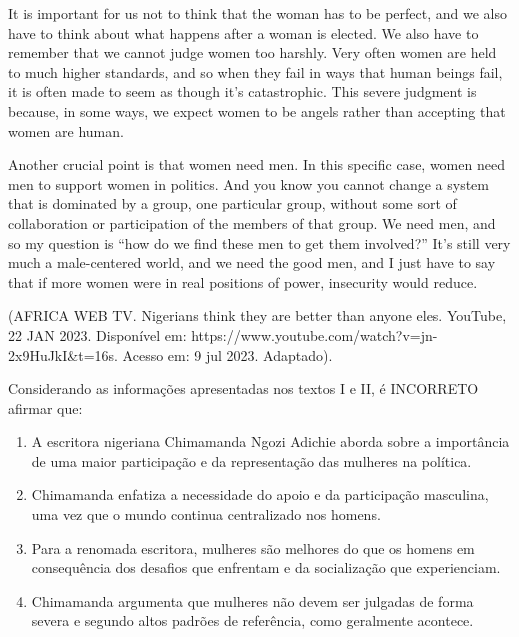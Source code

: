 It is important for us not to think that the woman has to be perfect, and we also have to think about what happens after a woman is elected. We also have to remember that we cannot judge women too harshly. Very often women are held to much higher standards, and so when they fail in ways that human beings fail, it is often made to seem as though it's catastrophic. This severe judgment is because, in some ways, we expect women to be angels rather than accepting that women are human.

Another crucial point is that women need men. In this specific case, women need men to support women in politics. And you know you cannot change a system that is dominated by a group, one particular group, without some sort of collaboration or participation of the members of that group. We need men, and so my question is “how do we find these men to get them involved?” It's still very much a male-centered world, and we need the good men, and I just have to say that if more women were in real positions of power, insecurity would reduce.

(AFRICA WEB TV. Nigerians think they are better than anyone eles. YouTube, 22 JAN 2023. Disponível em: https://www.youtube.com/watch?v=jn-2x9HuJkI&t=16s. Acesso em: 9 jul 2023. Adaptado).

Considerando as informações apresentadas nos textos I e II, é INCORRETO afirmar que:
\begin{enumerate}
\item A escritora nigeriana Chimamanda Ngozi Adichie aborda sobre a importância de uma maior participação e
        da representação das mulheres na política.
\item Chimamanda enfatiza a necessidade do apoio e da participação masculina, uma vez que o mundo
        continua centralizado nos homens.
\item Para a renomada escritora, mulheres são melhores do que os homens em consequência dos desafios que
        enfrentam e da socialização que experienciam.
\item Chimamanda argumenta que mulheres não devem ser julgadas de forma severa e segundo altos padrões
        de referência, como geralmente acontece.
\end{enumerate}
